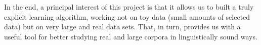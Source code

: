 \documentclass[output=paper,colorlinks,citecolor=brown,
]{langscibook}
\begin{document}
In the end, a principal interest of this project is that it allows us to built a truly explicit learning algorithm, working not on toy data (small amounts of selected data) but on very large and real data sets. That, in turn, provides us with a useful tool for better studying real and large corpora in linguistically sound ways. 










 

\printbibliography[heading=subbibliography,notkeyword=this]
\end{document}
